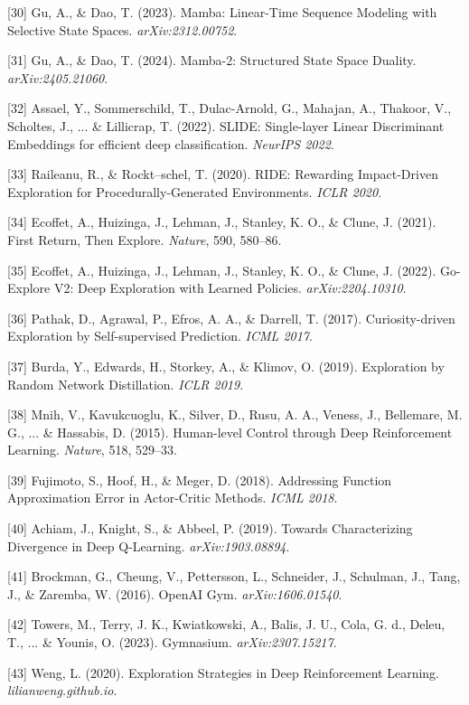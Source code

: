 \documentclass[11pt]{article}
\begin{document}
[30] Gu, A., \& Dao, T. (2023). Mamba: Linear-Time Sequence Modeling with
    Selective State Spaces. \textit{arXiv:2312.00752}.

[31] Gu, A., \& Dao, T. (2024). Mamba-2: Structured State Space Duality.
    \textit{arXiv:2405.21060}.

[32] Assael, Y., Sommerschild, T., Dulac-Arnold, G., Mahajan, A., Thakoor, V.,
    Scholtes, J., ... \& Lillicrap, T. (2022). SLIDE: Single-layer Linear
    Discriminant Embeddings for efficient deep classification. \textit{NeurIPS 2022}.

[33] Raileanu, R., \& Rockt--schel, T. (2020). RIDE: Rewarding Impact-Driven
    Exploration for Procedurally-Generated Environments. \textit{ICLR 2020}.

[34] Ecoffet, A., Huizinga, J., Lehman, J., Stanley, K. O., \& Clune, J. (2021).
    First Return, Then Explore. \textit{Nature}, 590, 580--86.

[35] Ecoffet, A., Huizinga, J., Lehman, J., Stanley, K. O., \& Clune, J. (2022).
    Go-Explore V2: Deep Exploration with Learned Policies. \textit{arXiv:2204.10310}.

[36] Pathak, D., Agrawal, P., Efros, A. A., \& Darrell, T. (2017).
    Curiosity-driven Exploration by Self-supervised Prediction. \textit{ICML 2017}.

[37] Burda, Y., Edwards, H., Storkey, A., \& Klimov, O. (2019). Exploration by
    Random Network Distillation. \textit{ICLR 2019}.

[38] Mnih, V., Kavukcuoglu, K., Silver, D., Rusu, A. A., Veness, J., Bellemare,
    M. G., ... \& Hassabis, D. (2015). Human-level Control through Deep
    Reinforcement Learning. \textit{Nature}, 518, 529--33.

[39] Fujimoto, S., Hoof, H., \& Meger, D. (2018). Addressing Function
    Approximation Error in Actor-Critic Methods. \textit{ICML 2018}.

[40] Achiam, J., Knight, S., \& Abbeel, P. (2019). Towards Characterizing
    Divergence in Deep Q-Learning. \textit{arXiv:1903.08894}.

[41] Brockman, G., Cheung, V., Pettersson, L., Schneider, J., Schulman, J.,
    Tang, J., \& Zaremba, W. (2016). OpenAI Gym. \textit{arXiv:1606.01540}.

[42] Towers, M., Terry, J. K., Kwiatkowski, A., Balis, J. U., Cola, G. d.,
    Deleu, T., ... \& Younis, O. (2023). Gymnasium. \textit{arXiv:2307.15217}.

[43] Weng, L. (2020). Exploration Strategies in Deep Reinforcement Learning.
    \textit{lilianweng.github.io}.
\end{document}
